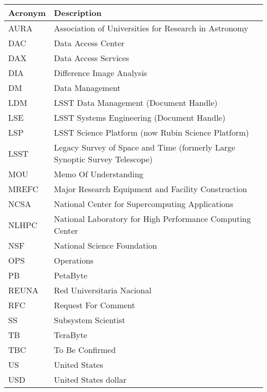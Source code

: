 \addtocounter{table}{-1}
\begin{longtable}{p{}p{}}\hline
\textbf{Acronym} & \textbf{Description}  \\\hline

AURA & Association of Universities for Research in Astronomy \\\hline
DAC & Data Access Center \\\hline
DAX & Data Access Services \\\hline
DIA & Difference Image Analysis \\\hline
DM & Data Management \\\hline
LDM & LSST Data Management (Document Handle) \\\hline
LSE & LSST Systems Engineering (Document Handle) \\\hline
LSP & LSST Science Platform (now Rubin Science Platform) \\\hline
LSST & Legacy Survey of Space and Time (formerly Large Synoptic Survey Telescope) \\\hline
MOU & Memo Of Understanding \\\hline
MREFC & Major Research Equipment and Facility Construction \\\hline
NCSA & National Center for Supercomputing Applications \\\hline
NLHPC & National Laboratory for High Performance Computing Center \\\hline
NSF & National Science Foundation \\\hline
OPS & Operations \\\hline
PB & PetaByte \\\hline
REUNA & Red Universitaria Nacional \\\hline
RFC & Request For Comment \\\hline
SS & Subsystem Scientist \\\hline
TB & TeraByte \\\hline
TBC & To Be Confirmed \\\hline
US & United States \\\hline
USD & United States dollar \\\hline
\end{longtable}
